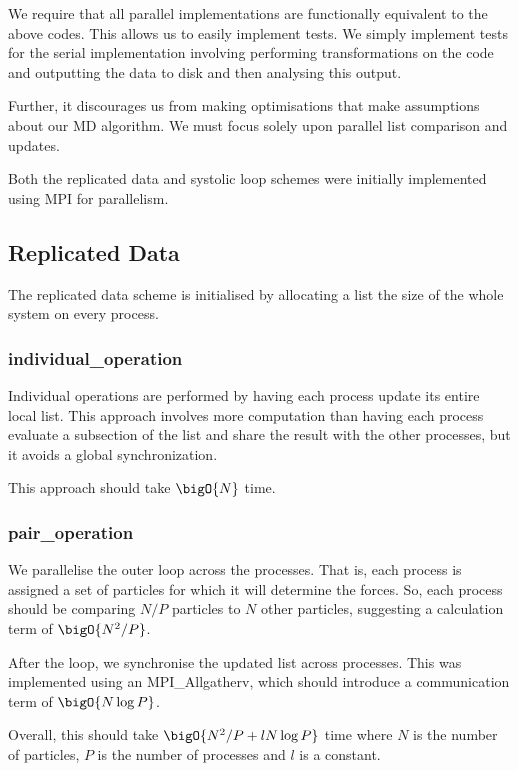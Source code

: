 We require that all parallel implementations are functionally equivalent
to the above codes.
%
This allows us to easily implement tests.
%
We simply implement tests for the serial implementation involving
performing transformations on the code and outputting the data to disk
and then analysing this output.

Further, it discourages us from making optimisations that make
assumptions about our MD algorithm.
%
We must focus solely upon parallel list comparison and updates.

Both the replicated data and systolic loop schemes were initially implemented
using MPI for parallelism.



\subsection{Replicated Data}

The replicated data scheme is initialised by allocating a list the
size of the whole system on every process.


\subsubsection{individual\_operation}

Individual operations are performed by having each process update
its entire local list.
This approach involves more computation than having each process
evaluate a subsection of the list and share the result with the
other processes, but it avoids a global synchronization.

This approach should take $\bigO{N}$ time.



\subsubsection{pair\_operation}

We parallelise the outer loop across the processes.
That is, each process is assigned a set of particles for which
it will determine the forces.
So, each process should be comparing $N/P$ particles to $N$ other
particles, suggesting a calculation term of $\bigO{N^2/P}$.

After the loop, we synchronise the updated list across processes.
This was implemented using an MPI\_Allgatherv, which
should introduce a communication term of $\bigO{N\log{P}}$.

Overall, this should take $\bigO{N^2/P + lN\log{P}}$ time
where $N$ is the number of particles,
$P$ is the number of processes and
$l$ is a constant.

